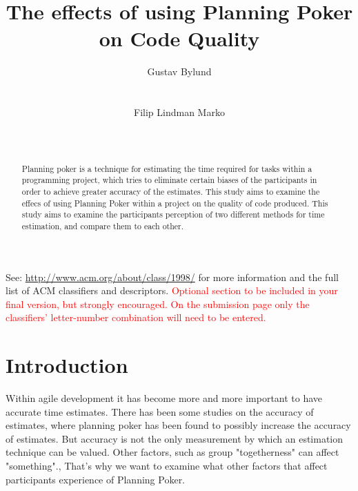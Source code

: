 \documentclass{sigchi}
\begin{document}
\title{The effects of using Planning Poker on Code Quality}

\author{
  \alignauthor Gustav Bylund\\
  \\
    \\
  \alignauthor Filip Lindman Marko\\
    \\
    \\
}

\maketitle

\begin{abstract}
Planning poker is a technique for estimating the time required for tasks
within a programming project, which tries to eliminate certain biases of
the participants in order to achieve greater accuracy of the estimates\cite{grenning2002planning}.
This study aims to examine the effecs of using Planning Poker within a project on the quality of code produced.
This study aims to examine the participants perception of two different
methods for time estimation, and compare them to each other.
\end{abstract}



See: \url{http://www.acm.org/about/class/1998/}
for more information and the full list of ACM classifiers
and descriptors. \newline
\textcolor{red}{Optional section to be included in your final version,
but strongly encouraged. On the submission page only the classifiers’
letter-number combination will need to be entered.}

\section{Introduction}
Within agile development it has become more and more important to have accurate time estimates. There has been some studies on the accuracy of estimates, where planning poker has been found to possibly increase the accuracy of estimates\cite{molokken2007combining}.
But accuracy is not the only measurement by which an estimation technique can be valued. Other factors, such as group "togetherness" can affect "something".\cite{wellington2005examining}, That's why we want to examine what other factors that affect participants experience of Planning Poker.
\end{document}
